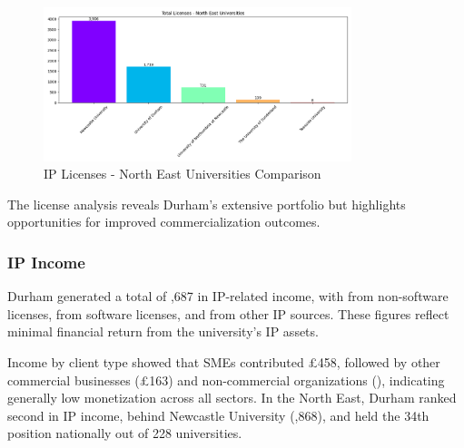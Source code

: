 \documentclass[journal,onecolumn, 10pt,draftclsnofoot]{IEEEtran}
\begin{document}
\begin{figure}[h]
\centering
\includegraphics[width=0.8\textwidth]{Fig/figure23.license_ne_comparison.png}
\caption{IP Licenses - North East Universities Comparison}
\label{fig:license-ne-comparison}
\end{figure}

The license analysis reveals Durham's extensive portfolio but highlights opportunities for improved commercialization outcomes.

\subsubsection{IP Income}

Durham generated a total of ,687 in IP-related income, with  from non-software licenses,  from software licenses, and  from other IP sources. These figures reflect minimal financial return from the university's IP assets.

Income by client type showed that SMEs contributed \pounds 458, followed by other commercial businesses (\pounds 163) and non-commercial organizations (), indicating generally low monetization across all sectors. In the North East, Durham ranked second in IP income, behind Newcastle University (,868), and held the 34th position nationally out of 228 universities.
\end{document}
